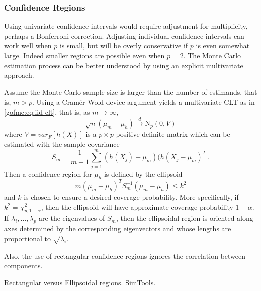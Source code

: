 \documentclass[12pt]{article}
\theoremstyle{plain}
\theoremstyle{definition}
\theoremstyle{remark}
\begin{document}
\subsubsection{Confidence Regions}
\label{gofmc:sec:multivariate confidence regions}
Using univariate confidence intervals would require adjustment for
multiplicity, perhaps a Bonferroni correction.  Adjusting individual
confidence intervals can work well when $p$ is small, but will be
overly conservative if $p$ is even somewhat large.  Indeed smaller
regions are possible even when $p=2$. The
Monte Carlo estimation process can be better understood by using an
explicit multivariate approach.

Assume the Monte Carlo sample size is larger than the number of
estimands, that is, $m > p$.  Using a Cram{\' e}r-Wold device argument
yields a multivariate CLT as in \eqref{gofmc:eq:iid clt}, that is, as
$m \to \infty$,
\begin{equation}
\label{gofmc:eq:multi iid clt}
\sqrt{n}(\mu_m - \mu_h) \stackrel{d}{\to} \text{N}_{p}(0, V)
\end{equation}
where $V=var_{F}[h(X)]$ is a $p \times p$ positive definite matrix
which can be estimated with the sample covariance
\begin{equation*}
S_m = \frac{1}{m-1} \sum_{j=1}^{m} (h(X_{j}) - \mu_m)(h(X_{j} -
\mu_m)^{T} \; .
\end{equation*}
Then a confidence region for $\mu_h$ is defined by the ellipsoid
$$
m(\mu_m - \mu_h)^T S_m^{-1} (\mu_m - \mu_h) \le k^2
$$
and $k$ is chosen to ensure a desired coverage probability.  More
specifically, if $k^2 =\chi^2_{p, 1-\alpha}$, then the ellipsoid will
have approximate coverage probability $1-\alpha$. If
$\lambda_{i}, \ldots, \lambda_{p}$ are the eigenvalues of $S_m$, then
the ellipsoidal region is oriented along axes determined by the
corresponding eigenvectors and whose lengths are proportional to
$\sqrt{\lambda_{i}}$.

Also, the use of rectangular
confidence regions ignores the correlation between components.

Rectangular versus Ellipsoidal regions.  SimTools.
\end{document}
